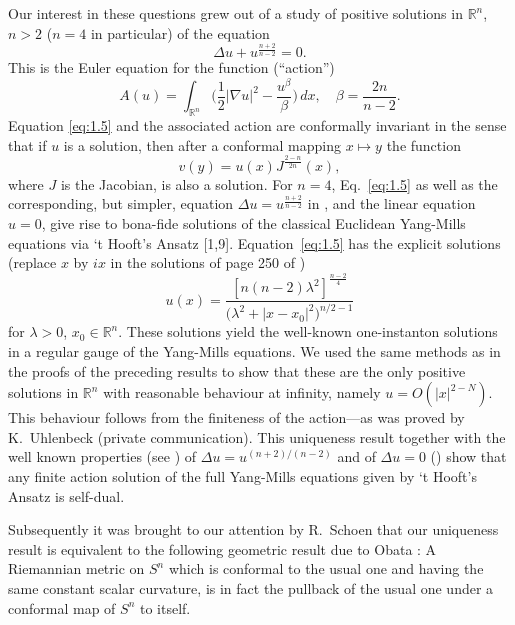 Our interest in these questions grew out of a study of positive solutions in $\mathbb{R}^n$,
$n > 2$ ($n = 4$ in particular) of the equation
\begin{equation}\label{eq:1.5}
  \Delta u + u^{\frac{n+2}{n-2}} = 0.
\end{equation}
This is the Euler equation for the function (``action'')
\[A(u) = \int_{\mathbb{R}^n} \biggl(\frac{1}{2}|\nabla u|^2 - \frac{u^\beta}{\beta}\biggr)\,dx,
  \quad \beta = \frac{2n}{n-2}.\]
Equation \eqref{eq:1.5} and the associated action are conformally invariant 
in the sense that if $u$ is a solution, then after a conformal mapping $x\mapsto y$ the function
\begin{equation}
  v(y) = u(x) J^{\frac{2-n}{2n}}(x),
\end{equation}
where $J$ is the Jacobian, is also a solution. For $n=4$, Eq.~\eqref{eq:1.5}
as well as the corresponding, but simpler, equation $\Delta u = u^{\frac{n+2}{n-2}}$
in \cite{loewner_partial_1974},
and the linear equation $u = 0$, give rise to bona-fide solutions of the classical Euclidean
Yang-Mills equations via `t Hooft's Ansatz [1,9]. 
Equation~\eqref{eq:1.5} has the explicit solutions (replace $x$ by $ix$ in the solutions of 
page 250 of \cite{loewner_partial_1974})
\begin{equation}\label{eq:1.7}
  u(x) = \frac{[n(n-2)\lambda^2]^{\frac{n-2}{4}}}{\bigl(\lambda^2+|x-x_0|^2\bigr)^{n/2-1}}
\end{equation}
for $\lambda>0$, $x_0\in \mathbb{R}^n$.
These solutions yield the well-known one-instanton solutions in a regular gauge of the Yang-Mills 
equations. We used the same methods as in the proofs of the preceding results to show that these
are the only positive solutions in $\mathbb{R}^n$ with reasonable behaviour at infinity,
namely $u=O(|x|^{2-N})$. This behaviour follows from the finiteness of the action---as was 
proved by K.~Uhlenbeck (private communication). This uniqueness result together with the well 
known properties (see \cite{loewner_partial_1974}) of $\Delta u = u^{(n+2)/(n-2)}$ and 
of $\Delta u = 0$ (\cite{hopf_differential_2003}) show 
that any finite action solution of the full Yang-Mills equations given by `t Hooft's Ansatz is 
self-dual.

Subsequently it was brought to our attention by R.~Schoen that our uniqueness result 
is equivalent to the following geometric result due to Obata \cite{obata_conjectures_1971}: A Riemannian metric on 
$S^n$ which is conformal to the usual one and having the same constant scalar curvature,
is in fact the pullback of the usual one under a conformal map of $S^n$ to itself.

